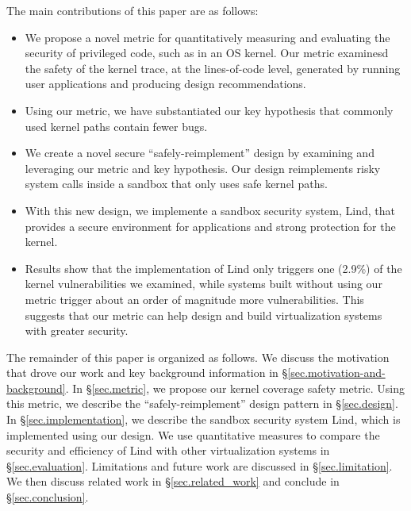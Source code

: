 The main contributions of this paper are as follows: 
\begin{itemize}
\item We propose a novel metric for quantitatively measuring and evaluating the
security of privileged code, such as in an OS kernel. Our metric examinesd
the safety of the kernel trace, at the lines-of-code level, generated by
running user applications and producing design recommendations.
\item Using our metric, we have substantiated our key hypothesis that commonly
used kernel paths contain fewer bugs. 
\item We create a novel secure ``safely-reimplement'' design by examining and
leveraging our metric and key hypothesis. 
Our design reimplements risky system calls inside a
sandbox that only uses safe kernel paths. 
\item With this new design, we implemente a sandbox security system, Lind, that
provides a secure environment for applications and strong protection for
the kernel.
\item Results show that the implementation of Lind only triggers one (2.9\%) of
the kernel vulnerabilities we examined, while systems built without using
our metric trigger about an order of magnitude more vulnerabilities. This
suggests that our metric can help design and build virtualization systems
with greater security. 
\end{itemize}


The remainder of this paper is organized as follows. 
We discuss the motivation that drove our work and key background information 
in \S{\ref{sec.motivation-and-background}}. 
In \S{\ref{sec.metric}}, we propose our kernel coverage safety metric. 
Using this metric, we describe the 
``safely-reimplement'' design pattern in \S{\ref{sec.design}}. In 
\S{\ref{sec.implementation}}, we describe the sandbox security 
system Lind, which is implemented using our design. We use quantitative 
measures to compare the security and efficiency of Lind with other 
virtualization systems in \S{\ref{sec.evaluation}}. 
Limitations and future work are discussed in \S{\ref{sec.limitation}}.  
We then discuss related work in \S{\ref{sec.related_work}} and conclude
in \S{\ref{sec.conclusion}}.


